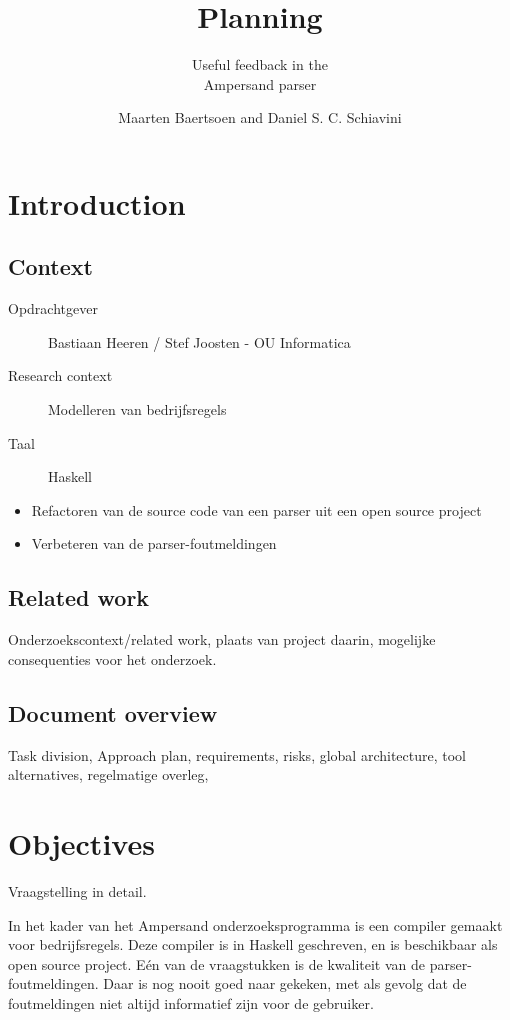 \documentclass[a4paper,12pt,abstracton,titlepage]{scrartcl}
\author{Maarten Baertsoen and Daniel S. C. Schiavini}
\affil{Open Universiteit Nederland, faculteit Informatica \\
	T61327 - Afstudeerproject bachelor informatica}
\title{Planning}
\subtitle{Useful feedback in the\\ Ampersand parser}
\begin{document}
\maketitle
\newpage

\tableofcontents
\clearpage

\section{Introduction}
\subsection{Context}
\begin{description}
\item [Opdrachtgever] Bastiaan Heeren / Stef Joosten - OU Informatica
\item [Research context] Modelleren van bedrijfsregels
\item [Taal] Haskell
\end{description}

\begin{itemize}
\item Refactoren van de source code van een parser uit een open source project 
\item Verbeteren van de parser-foutmeldingen
\end{itemize}

\subsection{Related work}
Onderzoekscontext/related work, plaats van project daarin, mogelijke consequenties voor het onderzoek.

\subsection{Document overview}
\lipsum[1]

Task division, Approach plan, requirements, risks, global architecture, tool alternatives,
regelmatige overleg,


\newpage
\section{Objectives}
Vraagstelling in detail.

In het kader van het Ampersand onderzoeksprogramma is een compiler gemaakt voor bedrijfsregels. Deze compiler is in Haskell geschreven, en is beschikbaar als open source project. Eén van de vraagstukken is de kwaliteit van de parser-foutmeldingen. Daar is nog nooit goed naar gekeken, met als gevolg dat de foutmeldingen niet altijd informatief zijn voor de gebruiker.
\end{document}
